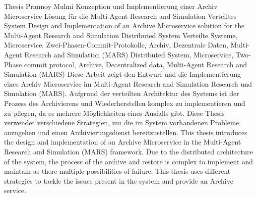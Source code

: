 													{ Thesis }																			%
													{Prannoy Mulmi}														%
													{Konzeption und Implementierung einer Archiv Microservice L\"osung f\"ur die Multi-Agent Research and
													Simulation Verteiltes System}											  %
													{Design and Implementation of an Archive Microservice solution for the Multi-Agent Research and
													Simulation Distributed System}							%
													{Verteilte Systeme, Microservice, Zwei-Phasen-Commit-Protokolle, Archiv, Dezentrale Daten, Multi-Agent Research and Simulation (MARS)}																		%
													{Distributed System, Microservice, Two-Phase commit protocol, Archive, Decentralized data, Multi-Agent Research and Simulation (MARS)}																			%
													{Diese Arbeit zeigt den Entwurf und die Implementierung eines Archiv Microservice im Multi-Agent Research and Simulation
													Research und Simulation (MARS). Aufgrund der verteilten Architektur des Systems ist der Prozess des Archivierens
													und Wiederherstellen komplex zu implementieren und zu pflegen, da es mehrere M\"oglichkeiten eines Ausfalls gibt. Diese Thesis
													verwendet verschiedene Strategien, um die im System vorhandenen Probleme anzugehen und einen Archivierungsdienst bereitzustellen.}	
													{This thesis introduces the design and implementation of an Archive Microservice in the Multi-Agent Research and Simulation (MARS) 
													framework. Due to the distributed architecture of the system, the process of the archive and restore is complex to implement and 
													maintain as there multiple possibilities of failure. This thesis uses different strategies to tackle the issues present in the 
													system and provide an Archive service.}	

												
  									  													


	  																							

